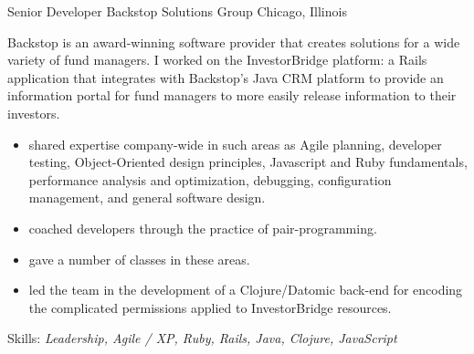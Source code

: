 \documentclass[11pt,letterpaper]{moderncv}
\begin{document}
 {Senior Developer} {Backstop Solutions Group} {Chicago, Illinois} {} {%
  Backstop is an award-winning software provider that creates solutions for a
  wide variety of fund managers.  I worked on the InvestorBridge platform: a
  Rails application that integrates with Backstop's Java CRM platform to
  provide an information portal for fund managers to more easily release
  information to their investors.
  \begin{itemize}
  \item shared expertise company-wide in such areas as Agile planning,
    developer testing, Object-Oriented design principles, Javascript
    and Ruby fundamentals, performance analysis and optimization,
    debugging, configuration management, and general software design.
  \item coached developers through the practice of pair-programming.
  \item gave a number of classes in these areas.
  \item led the team in the development of a Clojure/Datomic back-end for encoding the
    complicated permissions applied to InvestorBridge resources.
  \end{itemize}
  Skills: \emph{Leadership, Agile / XP, Ruby, Rails, Java, Clojure, JavaScript}
}
\end{document}
